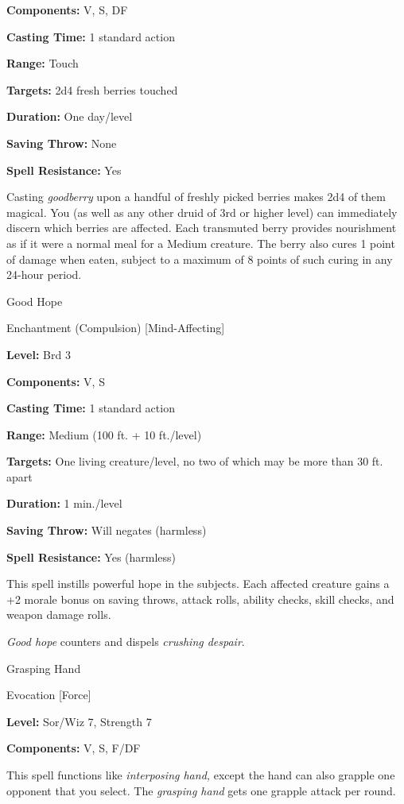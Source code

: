 \documentclass{article}
\begin{document}
\textbf{Components:} V, S, DF

\textbf{Casting Time:} 1 standard action

\textbf{Range:} Touch

\textbf{Targets:} 2d4 fresh berries touched

\textbf{Duration:} One day/level

\textbf{Saving Throw:} None

\textbf{Spell Resistance:} Yes

Casting \textit{goodberry }upon a handful of freshly picked berries makes 2d4 of 
them magical. You (as well as any other druid of 3rd or higher level) can immediately 
discern which berries are affected. Each transmuted berry provides nourishment 
as if it were a normal meal for a Medium creature. The berry also cures 1 point 
of damage when eaten, subject to a maximum of 8 points of such curing in any 24-hour 
period.

\vspace{12pt}
Good Hope

Enchantment (Compulsion) [Mind-Affecting]

\textbf{Level:} Brd 3

\textbf{Components:} V, S

\textbf{Casting Time:} 1 standard action

\textbf{Range: }Medium (100 ft. + 10 ft./level)

\textbf{Targets:} One living creature/level, no two of which may be more than 30 
ft. apart

\textbf{Duration:} 1 min./level

\textbf{Saving Throw: }Will negates (harmless)

\textbf{Spell Resistance:} Yes (harmless)

This spell instills powerful hope in the subjects. Each affected creature gains 
a +2 morale bonus on saving throws, attack rolls, ability checks, skill checks, 
and weapon damage rolls.

\textit{Good hope }counters and dispels \textit{crushing despair}.

\vspace{12pt}
Grasping Hand

Evocation [Force]

\textbf{Level:} Sor/Wiz 7, Strength 7

\textbf{Components:} V, S, F/DF

This spell functions like \textit{interposing hand, }except the hand can also grapple 
one opponent that you select. The \textit{grasping hand }gets one grapple attack 
per round.
\end{document}
